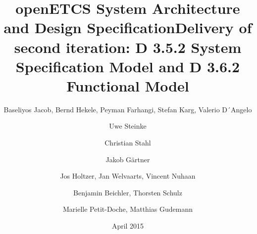 \documentclass{template/openetcs_report}
\begin{document}
\frontmatter
{}

\newcommand{\define}[1]{\index{#1}\emph{#1}}







%




\title{openETCS System Architecture and Design Specification}

\title {Delivery of second iteration: D 3.5.2 System Specification Model and D 3.6.2 Functional Model}

\date{April 2015}








\author{Baseliyos Jacob, Bernd Hekele, Peyman Farhangi, Stefan Karg, Valerio D´Angelo}

\author{Uwe Steinke}

\author{Christian Stahl}

\author{Jakob Gärtner}

\author{Jos Holtzer, Jan Welvaarts, Vincent Nuhaan}

\author{Benjamin Beichler, Thorsten Schulz}

\author{Marielle Petit-Doche, Matthias Gudemann}
\end{document}
